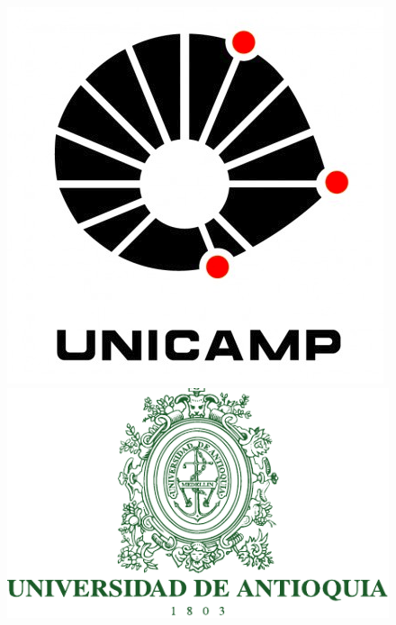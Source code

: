 \documentclass[a4paper,10pt,epsfig,epsf,amsfonts,amsmath]{article}
\begin{document}
%
%
\thispagestyle{empty}

\begin{figure}
    \centering
    \begin{minipage}{1.2\textwidth}
        \centering
        \includegraphics[scale=0.2]{unicamp-logo-red} %
        \includegraphics[scale=0.7]{udea} 
    \end{minipage}
    

\end{figure}
\end{document}
